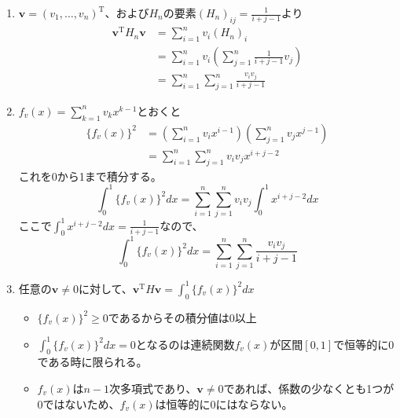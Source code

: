\documentclass[dvipdfmx]{jsreport}
\begin{document}
\begin{souanswer}
\begin{enumerate}
	\item $\bm{v}= (v_1, \ldots, v_n)^\mathrm{T}$、および$H_n$の要素$(H_n)_{ij}= \frac{1}{i+ j- 1}$より
\begin{align*}
	\bm{v}^\mathrm{T}H_n\bm{v}
	&= \sum_{i= 1}^n v_i (H_n)_i\\
	&= \sum_{i= 1}^n v_i\left(\sum_{j= 1}^n \frac{1}{i+ j- 1}v_j\right)\\
	&= \sum_{i= 1}^n \sum_{j= 1}^n\frac{v_i v_j}{i+ j- 1}
\end{align*}
	\item $f_v(x)= \sum_{k= 1}^n v_kx^{k- 1}$とおくと
\begin{align*}
	\{f_v(x)\}^2
	&= \left(\sum_{i= 1}^n v_ix^{i- 1}\right)\left(\sum_{j= 1}^n v_jx^{j- 1}\right)\\
	&= \sum_{i= 1}^n\sum_{j= 1}^n v_iv_j x^{i+ j- 2}
\end{align*}
	これを0から1まで積分する。
\begin{equation*}
	\int_0^1\{f_v(x)\}^2 dx= \sum_{i= 1}^n \sum_{j= 1}^n v_iv_j \int_0^1 x^{i+ j-2} dx
\end{equation*}
	ここで$\int_0^1 x^{i+ j- 2} dx= \frac{1}{i+ j- 1}$なので、
\begin{equation*}
	\int_0^1\{f_v(x)\}^2 dx= \sum_{i= 1}^n \sum_{j= 1}^n\frac{v_iv_j}{i+ j- 1}
\end{equation*}
	\item 任意の$\bm{v}\ne 0$に対して、$\bm{v}^\mathrm{T}H\bm{v}= \int_0^1 \{f_v(x)\}^2 dx$
\begin{itemize}
	\item $\{f_v(x)\}^2\ge 0$であるからその積分値は0以上
	\item $\int_0^1 \{f_v(x)\}^2 dx= 0$となるのは連続関数$f_v(x)$が区間$[0, 1]$で恒等的に0である時に限られる。
	\item $f_v(x)$は$n- 1$次多項式であり、$\bm{v}\ne 0$であれば、係数の少なくとも1つが0ではないため、$f_v(x)$は恒等的に0にはならない。
\end{itemize}
\end{enumerate}
\end{souanswer}
\end{document}
